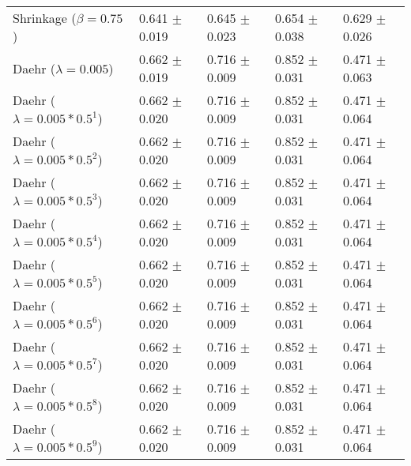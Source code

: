 \begin{table}
\begin{tabular}{*{5}{l}}
Shrinkage ($\beta=0.75$)&0.641 $\pm$ 0.019&0.645 $\pm$ 0.023&0.654 $\pm$ 0.038&0.629 $\pm$ 0.026\\
Daehr ($\lambda=0.005$)&0.662 $\pm$ 0.019&0.716 $\pm$ 0.009&0.852 $\pm$ 0.031&0.471 $\pm$ 0.063\\
Daehr ($\lambda=0.005*0.5^1$)&0.662 $\pm$ 0.020&0.716 $\pm$ 0.009&0.852 $\pm$ 0.031&0.471 $\pm$ 0.064\\
Daehr ($\lambda=0.005*0.5^2$)&0.662 $\pm$ 0.020&0.716 $\pm$ 0.009&0.852 $\pm$ 0.031&0.471 $\pm$ 0.064\\
Daehr ($\lambda=0.005*0.5^3$)&0.662 $\pm$ 0.020&0.716 $\pm$ 0.009&0.852 $\pm$ 0.031&0.471 $\pm$ 0.064\\
Daehr ($\lambda=0.005*0.5^4$)&0.662 $\pm$ 0.020&0.716 $\pm$ 0.009&0.852 $\pm$ 0.031&0.471 $\pm$ 0.064\\
Daehr ($\lambda=0.005*0.5^5$)&0.662 $\pm$ 0.020&0.716 $\pm$ 0.009&0.852 $\pm$ 0.031&0.471 $\pm$ 0.064\\
Daehr ($\lambda=0.005*0.5^6$)&0.662 $\pm$ 0.020&0.716 $\pm$ 0.009&0.852 $\pm$ 0.031&0.471 $\pm$ 0.064\\
Daehr ($\lambda=0.005*0.5^7$)&0.662 $\pm$ 0.020&0.716 $\pm$ 0.009&0.852 $\pm$ 0.031&0.471 $\pm$ 0.064\\
Daehr ($\lambda=0.005*0.5^8$)&0.662 $\pm$ 0.020&0.716 $\pm$ 0.009&0.852 $\pm$ 0.031&0.471 $\pm$ 0.064\\
Daehr ($\lambda=0.005*0.5^9$)&0.662 $\pm$ 0.020&0.716 $\pm$ 0.009&0.852 $\pm$ 0.031&0.471 $\pm$ 0.064\\
\bottomrule
\end{tabular}
\end{table}

